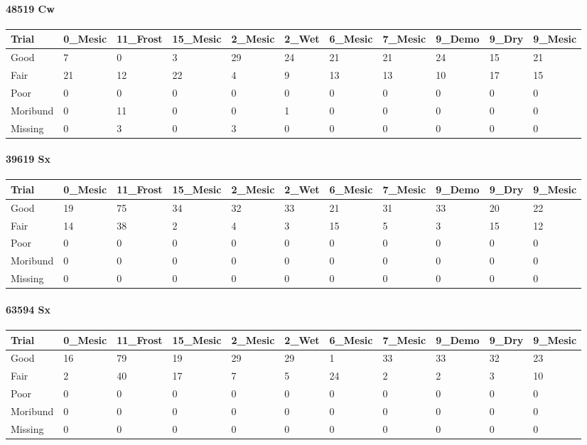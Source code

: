 \documentclass[
]{article}
\begin{document}
\hypertarget{cw-2}{%
\paragraph{48519 Cw}\label{cw-2}}

\begin{tabular}{l|l|l|l|l|l|l|l|l|l|l}
\hline
Trial & 0\_Mesic & 11\_Frost & 15\_Mesic & 2\_Mesic & 2\_Wet & 6\_Mesic & 7\_Mesic & 9\_Demo & 9\_Dry & 9\_Mesic\\
\hline
Good & 7 & 0 & 3 & 29 & 24 & 21 & 21 & 24 & 15 & 21\\
\hline
Fair & 21 & 12 & 22 & 4 & 9 & 13 & 13 & 10 & 17 & 15\\
\hline
Poor & 0 & 0 & 0 & 0 & 0 & 0 & 0 & 0 & 0 & 0\\
\hline
Moribund & 0 & 11 & 0 & 0 & 1 & 0 & 0 & 0 & 0 & 0\\
\hline
Missing & 0 & 3 & 0 & 3 & 0 & 0 & 0 & 0 & 0 & 0\\
\hline
\end{tabular}

\hypertarget{sx-2}{%
\paragraph{39619 Sx}\label{sx-2}}

\begin{tabular}{l|l|l|l|l|l|l|l|l|l|l}
\hline
Trial & 0\_Mesic & 11\_Frost & 15\_Mesic & 2\_Mesic & 2\_Wet & 6\_Mesic & 7\_Mesic & 9\_Demo & 9\_Dry & 9\_Mesic\\
\hline
Good & 19 & 75 & 34 & 32 & 33 & 21 & 31 & 33 & 20 & 22\\
\hline
Fair & 14 & 38 & 2 & 4 & 3 & 15 & 5 & 3 & 15 & 12\\
\hline
Poor & 0 & 0 & 0 & 0 & 0 & 0 & 0 & 0 & 0 & 0\\
\hline
Moribund & 0 & 0 & 0 & 0 & 0 & 0 & 0 & 0 & 0 & 0\\
\hline
Missing & 0 & 0 & 0 & 0 & 0 & 0 & 0 & 0 & 0 & 0\\
\hline
\end{tabular}

\hypertarget{sx-3}{%
\paragraph{63594 Sx}\label{sx-3}}

\begin{tabular}{l|l|l|l|l|l|l|l|l|l|l}
\hline
Trial & 0\_Mesic & 11\_Frost & 15\_Mesic & 2\_Mesic & 2\_Wet & 6\_Mesic & 7\_Mesic & 9\_Demo & 9\_Dry & 9\_Mesic\\
\hline
Good & 16 & 79 & 19 & 29 & 29 & 1 & 33 & 33 & 32 & 23\\
\hline
Fair & 2 & 40 & 17 & 7 & 5 & 24 & 2 & 2 & 3 & 10\\
\hline
Poor & 0 & 0 & 0 & 0 & 0 & 0 & 0 & 0 & 0 & 0\\
\hline
Moribund & 0 & 0 & 0 & 0 & 0 & 0 & 0 & 0 & 0 & 0\\
\hline
Missing & 0 & 0 & 0 & 0 & 0 & 0 & 0 & 0 & 0 & 0\\
\hline
\end{tabular}
\end{document}
